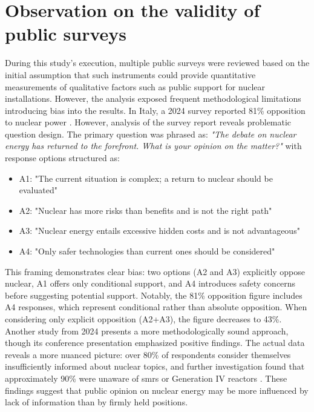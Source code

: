 \section{Observation on the validity of public surveys}
During this study's execution, multiple public surveys were reviewed based on the initial assumption that such instruments could provide quantitative measurements of qualitative factors such as public support for nuclear installations. However, the analysis exposed frequent methodological limitations introducing bias into the results. In Italy, a 2024 survey reported 81\% opposition to nuclear power \cite{IPSOS_Nuclear_Survey_2024}. However, analysis of the survey report reveals problematic question design. The primary question was phrased as: \textit{"The debate on nuclear energy has returned to the forefront. What is your opinion on the matter?"} with response options structured as:
\begin{itemize}
    \item A1: "The current situation is complex; a return to nuclear should be evaluated"
    \item A2: "Nuclear has more risks than benefits and is not the right path"
    \item A3: "Nuclear energy entails excessive hidden costs and is not advantageous"
    \item A4: "Only safer technologies than current ones should be considered"
\end{itemize}

This framing demonstrates clear bias: two options (A2 and A3) explicitly oppose nuclear, A1 offers only conditional support, and A4 introduces safety concerns before suggesting potential support. Notably, the 81\% opposition figure includes A4 responses, which represent conditional rather than absolute opposition. When considering only explicit opposition (A2+A3), the figure decreases to 43\%.\\

Another study from 2024 presents a more methodologically sound approach, though its conference presentation emphasized positive findings. The actual data reveals a more nuanced picture: over 80\% of respondents consider themselves insufficiently informed about nuclear topics, and further investigation found that approximately 90\% were unaware of \glspl{smr} or Generation IV reactors \cite{SWG_Nuclear_Survey_2024}. These findings suggest that public opinion on nuclear energy may be more influenced by lack of information than by firmly held positions.

